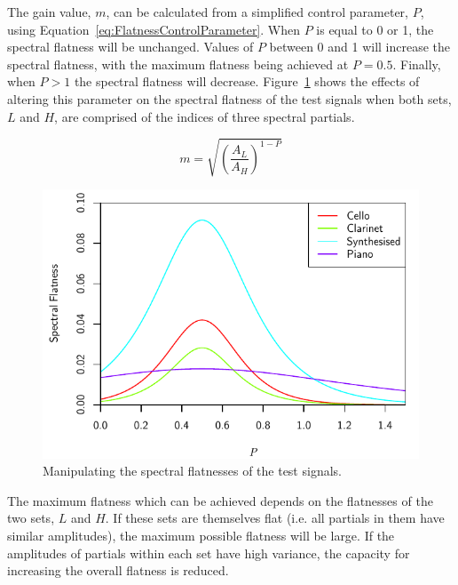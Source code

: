 		The gain value, $m$, can be calculated from a simplified control parameter, $P$, using
		Equation~\ref{eq:FlatnessControlParameter}. When $P$ is equal to 0 or 1, the spectral flatness will be
		unchanged.  Values of $P$ between 0 and 1 will increase the spectral flatness, with the maximum flatness
		being achieved at $P = 0.5$. Finally, when $P > 1$ the spectral flatness will decrease.
		Figure~\ref{fig:MoveFlatnesses} shows the effects of altering this parameter on the spectral flatness of
		the test signals when both sets, $L$ and $H$, are comprised of the indices of three spectral partials.

		\begin{equation}
			m = \sqrt{ \left( \frac{A_L}{A_H} \right) ^{1 - P}}
			\label{eq:FlatnessControlParameter}
		\end{equation}

		\begin{figure}[h!]
			\centering
			\includegraphics{chapter6/Images/MoveFlatnesses.pdf}
			\caption{Manipulating the spectral flatnesses of the test signals.}
			\label{fig:MoveFlatnesses}
		\end{figure}

		The maximum flatness which can be achieved depends on the flatnesses of the two sets, $L$ and $H$.  If
		these sets are themselves flat (i.e. all partials in them have similar amplitudes), the maximum possible
		flatness will be large. If the amplitudes of partials within each set have high variance, the capacity for
		increasing the overall flatness is reduced.

